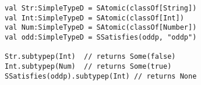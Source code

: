 \begin{lstlisting}[style=scalaioScala]
val Str:SimpleTypeD = SAtomic(classOf[String])
val Int:SimpleTypeD = SAtomic(classOf[Int])
val Num:SimpleTypeD = SAtomic(classOf[Number])
val odd:SimpleTypeD = SSatisfies(oddp, "oddp")

Str.subtypep(Int)  // returns Some(false)
Int.subtypep(Num)  // returns Some(true)
SSatisfies(oddp).subtypep(Int) // returns None
\end{lstlisting}
